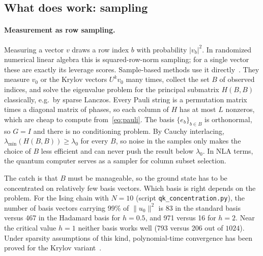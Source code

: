 \documentclass[11pt,a4paper]{article}
\begin{document}
\subsection{What does work: sampling}\label{sec:sampling}

\paragraph{Measurement as row sampling.} Measuring a vector $v$ draws a
row index $b$ with probability $|v_b|^2$. In randomized numerical linear
algebra this is squared-row-norm sampling; for a single vector these
are exactly its leverage scores. Sample-based methods use it
directly~\cite{RM25,SKQD}. They measure $v_0$ or the Krylov vectors
$U^kv_0$ many times, collect the set $B$ of observed indices, and solve
the eigenvalue problem for the principal submatrix $H(B,B)$ classically,
e.g.\ by sparse Lanczos. Every Pauli string is a permutation matrix times
a diagonal matrix of phases, so each column of $H$ has at most $L$
nonzeros, which are cheap to compute from~\eqref{eq:pauli}. The basis
$\{e_b\}_{b\in B}$ is orthonormal, so $G=I$ and there is no conditioning
problem. By Cauchy interlacing, $\lambda_{\min}(H(B,B))\ge\lambda_0$ for
every $B$, so noise in the samples only makes the choice of $B$ less
efficient and can never push the result below $\lambda_0$. In NLA terms,
the quantum computer serves as a sampler for column subset selection.

The catch is that $B$ must be manageable, so the ground state has to be
concentrated on relatively few basis vectors. Which basis is right
depends on the problem. For the Ising chain with $N=10$ (script
\texttt{qk\_concentration.py}), the number of basis vectors carrying 99\%
of $\|u_0\|^2$ is 83 in the standard basis versus 467 in the Hadamard
basis for $h=0.5$, and 971 versus 16 for $h=2$. Near the critical value
$h=1$ neither basis works well (793 versus 206 out of $1024$). Under
sparsity assumptions of this kind, polynomial-time convergence has been
proved for the Krylov variant~\cite{SKQD}.
\end{document}
